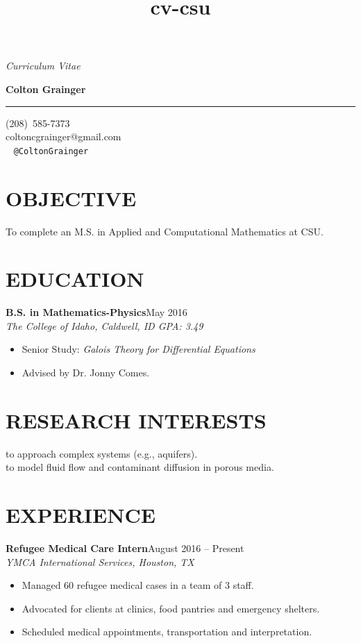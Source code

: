 \documentclass[margin]{res}
\title{cv-csu}
\newcommand\textbox[1]{\parbox{.333\textwidth}{#1} }
\newcommand\job[3]{\textbf{#1}\hfill {#2}\\ \emph{#3} }
\newcommand\degree[3]{\textbf{#1}\hfill {#2}\\ \emph{#3} }
\newenvironment{details}{\begin{itemize}[itemsep=0.6pt,topsep=2.2pt] }{\end{itemize} }
\begin{document}
 

\noindent\textbox{{\it Curriculum Vitae }\hfill } \textbox{\hfill{\large\bf Colton Grainger}\hfill }

\vspace{-20pt}
\rule{\textwidth}{1pt}

\vspace{-20pt}
\begin{flushright} 
(208)~585-7373\\ coltoncgrainger@gmail.com\\ \faTwitter\ \faGithub\hspace{1ex} {\tt @ColtonGrainger} 
\end{flushright}
\vspace{-24pt}

\begin{resume}

\section{OBJECTIVE}
To complete an M.S. in Applied and Computational Mathematics at CSU.

\section{EDUCATION}
\degree{B.S. in Mathematics-Physics}{May 2016}{The College of Idaho, Caldwell, ID \hfill {\rm GPA: 3.49}}
    \begin{details}
   		\item Senior Study: \emph{Galois Theory for Differential Equations}
        \item Advised by Dr. Jonny Comes.
    \end{details}

\section{RESEARCH INTERESTS}

 to approach complex systems (e.g., aquifers).\\
 to model fluid flow and contaminant diffusion in porous media.

\section{EXPERIENCE}
\job{Refugee Medical Care Intern}{August 2016 -- Present}{YMCA International Services, Houston, TX}
    \begin{details}
	  	\item Managed 60 refugee medical cases in a team of 3 staff.
        \item Advocated for clients at clinics, food pantries and emergency shelters. 
        \item Scheduled medical appointments, transportation and interpretation.
	\end{details}
     

\end{resume}
\end{document}
